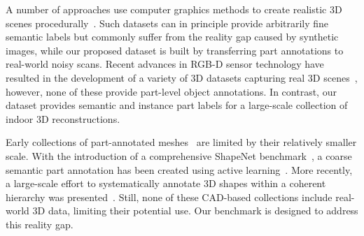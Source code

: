 A number of approaches use computer graphics methods to create realistic 3D scenes procedurally~\cite{2012-scenesynth,handa2016understanding,song2016ssc,McCormac:etal:ICCV2017,InteriorNet18,garcia2018robotrix}.
Such datasets can in principle provide arbitrarily fine semantic labels but commonly suffer from the reality gap caused by synthetic images, while our proposed dataset is built by transferring part annotations to real-world noisy scans.
Recent advances in RGB-D sensor technology have resulted in the development of a variety of 3D datasets capturing real 3D scenes~\cite{armeni20163d,hua2016scenenn,dai2017scannet,chang2017matterport3d,2017arXiv170201105A,replica19arxiv}, however, none of these provide part-level object annotations.
In contrast, our dataset provides semantic and instance part labels for a large-scale collection of indoor 3D reconstructions.




Early collections of part-annotated meshes~\cite{Chen:2009:ABF} are limited by their relatively smaller scale.
With the introduction of a comprehensive ShapeNet benchmark~\cite{chang2015shapenet}, a coarse semantic part annotation has been created using active learning~\cite{yi2016scalable}. 
More recently, a large-scale effort to systematically annotate 3D shapes within a coherent hierarchy was presented~\cite{mo2019partnet}.
Still, none of these CAD-based collections include real-world 3D data, limiting their potential use. Our benchmark is designed to address this reality gap.

